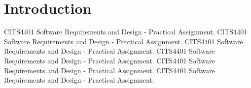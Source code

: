 \section{Introduction}

\par
CITS4401 Software Requirements and Design - Practical Assignment.
CITS4401 Software Requirements and Design - Practical Assignment.
CITS4401 Software Requirements and Design - Practical Assignment.
CITS4401 Software Requirements and Design - Practical Assignment.
CITS4401 Software Requirements and Design - Practical Assignment.
CITS4401 Software Requirements and Design - Practical Assignment.